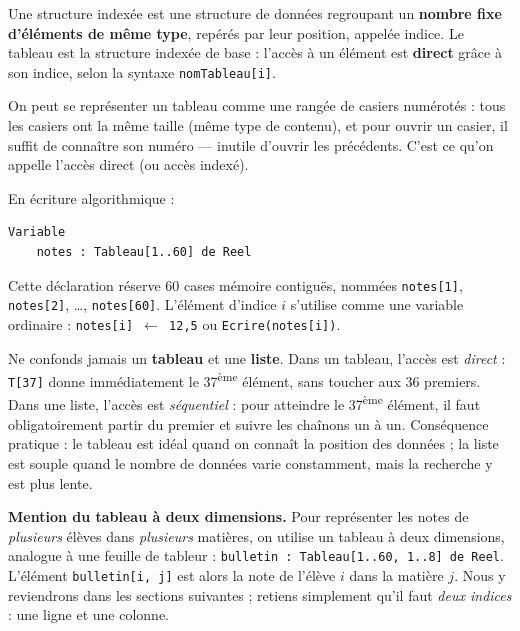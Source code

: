 \documentclass[11pt]{article}
\newcommand{\cle}[1]{{\popxbold\color{popdark}#1}}
\begin{document}
\begin{definition}
Une \cle{structure indexée} est une structure de données regroupant un \textbf{nombre fixe d'éléments de même type}, repérés par leur position, appelée \cle{indice}. Le \cle{tableau} est la structure indexée de base : l'accès à un élément est \textbf{direct} grâce à son indice, selon la syntaxe \texttt{nomTableau[i]}.
\end{definition}

On peut se représenter un tableau comme une rangée de casiers numérotés : tous les casiers ont la même taille (même type de contenu), et pour ouvrir un casier, il suffit de connaître son numéro — inutile d'ouvrir les précédents. C'est ce qu'on appelle l'\cle{accès direct} (ou accès indexé).

\begin{propriete}
En écriture algorithmique :
\begin{lstlisting}
Variable
    notes : Tableau[1..60] de Reel
\end{lstlisting}
Cette déclaration réserve 60 cases mémoire contiguës, nommées \texttt{notes[1]}, \texttt{notes[2]}, \ldots, \texttt{notes[60]}. L'élément d'indice $i$ s'utilise comme une variable ordinaire : \texttt{notes[i] $\leftarrow$ 12,5} ou \texttt{Ecrire(notes[i])}.
\end{propriete}

\begin{attention}
Ne confonds jamais un \textbf{tableau} et une \textbf{liste}. Dans un tableau, l'accès est \emph{direct} : \texttt{T[37]} donne immédiatement le 37\textsuperscript{ème} élément, sans toucher aux 36 premiers. Dans une liste, l'accès est \emph{séquentiel} : pour atteindre le 37\textsuperscript{ème} élément, il faut obligatoirement partir du premier et suivre les chaînons un à un. Conséquence pratique : le tableau est idéal quand on connaît la position des données ; la liste est souple quand le nombre de données varie constamment, mais la recherche y est plus lente.
\end{attention}

\textbf{Mention du tableau à deux dimensions.} Pour représenter les notes de \emph{plusieurs} élèves dans \emph{plusieurs} matières, on utilise un tableau à deux dimensions, analogue à une feuille de tableur : \texttt{bulletin : Tableau[1..60, 1..8] de Reel}. L'élément \texttt{bulletin[i, j]} est alors la note de l'élève $i$ dans la matière $j$. Nous y reviendrons dans les sections suivantes ; retiens simplement qu'il faut \emph{deux indices} : une ligne et une colonne.
\end{document}
